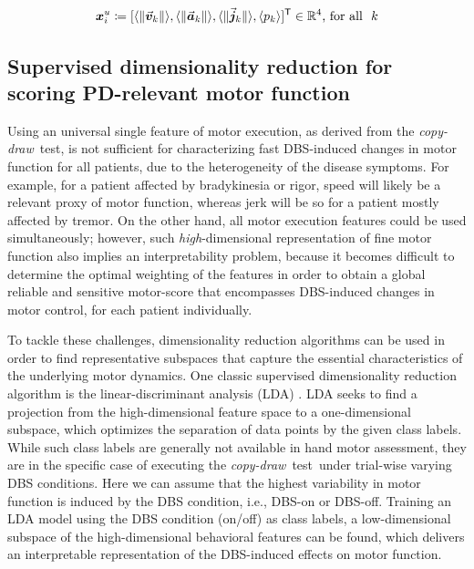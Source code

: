 \documentclass[10pt,a4paper, twocolumn]{article}
\newcommand{\cpdt}[0]{\textit{copy-draw}~test\xspace}
\newcommand{\speeddir}{\vec{\ve{v}}}
\newcommand{\jerkdir}{\vec{\ve{j}}}
\newcommand{\precisiondir}{{{p}}}
\newcommand{\acceldir}{\vec{\ve{a}}}
\begin{document}
\begin{align*}
\ve{x}^u_i \coloneqq \lbrack \langle\|\speeddir_k\|\rangle , \langle\|\acceldir_k\|\rangle, \langle\|\jerkdir_k\| \rangle , \langle\precisiondir_k\rangle  \rbrack^\T \in \Real^{4}\text{, for all}~~k
\end{align*}




\subsection{Supervised dimensionality reduction for scoring PD-relevant motor function}\label{sec:lda}
Using an universal single feature of motor execution, as derived from the \cpdt, is not sufficient for characterizing fast DBS-induced changes in motor function for all patients, due to the heterogeneity of the disease symptoms. For example, for a patient affected by bradykinesia or rigor, speed will likely be a relevant proxy of motor function, whereas jerk will be so for a patient mostly affected by tremor. On the other hand, all motor execution features could be used simultaneously; however, such \textit{high}-dimensional representation of fine motor function also implies an interpretability problem, because it becomes difficult to determine the optimal weighting of the features in order to obtain a global reliable and sensitive motor-score that encompasses DBS-induced changes in motor control, for each patient individually.

To tackle these challenges, dimensionality reduction algorithms can be used in order to find representative subspaces that capture the essential characteristics of the underlying motor dynamics. One classic supervised dimensionality reduction algorithm is the linear-discriminant analysis (LDA) \cite{duda2012pattern}. LDA seeks to find a projection from the high-dimensional feature space to a one-dimensional subspace, which optimizes the separation of data points by the given class labels. While such class labels are generally not available in hand motor assessment, they are in the specific case of executing the \cpdt~under trial-wise varying DBS conditions. Here we can assume that the highest variability in motor function is induced by the DBS condition, i.e., DBS-on or DBS-off. Training an LDA model using the DBS condition (on/off) as class labels, a low-dimensional subspace of the high-dimensional behavioral features can be found, which delivers an interpretable representation of the DBS-induced effects on motor function.
\end{document}
